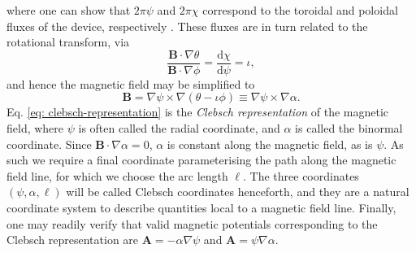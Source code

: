 where one can show that $2\pi\psi$ and $2\pi\chi$ correspond to the toroidal and poloidal fluxes of the device, respectively \cite{helander2014theory}. These fluxes are in turn related to the rotational transform, via
\begin{equation}
    \frac{\boldsymbol{B} \cdot \nabla \theta}{\boldsymbol{B} \cdot \nabla \phi}=\frac{\mathrm{d} \chi }{\mathrm{d} \psi} = \iota,
\end{equation}
and hence the magnetic field may be simplified to
\begin{equation}
    \boldsymbol{B} = \nabla \psi \times \nabla \left( \theta - \iota \phi \right) \equiv \nabla \psi \times \nabla \alpha.
    \label{eq: clebsch-representation}
\end{equation}
Eq. \eqref{eq: clebsch-representation} is the \textit{Clebsch representation} of the magnetic field, where $\psi$ is often called the radial coordinate, and $\alpha$ is called the binormal coordinate. Since $\boldsymbol{B} \cdot \nabla \alpha = 0$, $\alpha$ is constant along the magnetic field, as is $\psi$. As such we require a final coordinate parameterising the path along the magnetic field line, for which we choose the arc length $\ell$. The three coordinates $(\psi,\alpha,\ell)$ will be called Clebsch coordinates henceforth, and they are a natural coordinate system to describe quantities local to a magnetic field line. Finally, one may readily verify that valid magnetic potentials corresponding to the Clebsch representation are $\boldsymbol{A} = -\alpha \nabla \psi$ and $\boldsymbol{A} = \psi \nabla \alpha$. \par 
